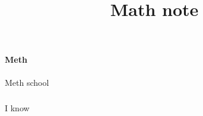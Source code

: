 \documentclass{article}
\title{Math note}
\begin{document}
\maketitle

\paragraph{Meth}
 Meth school
\subparagraph{}
I know
\end{document}
